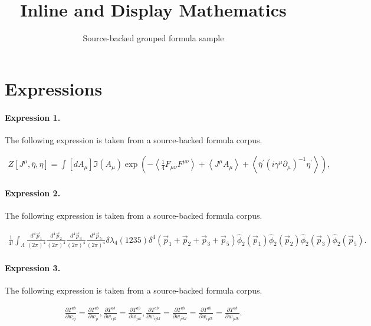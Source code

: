 \documentclass[11pt]{article}
\title{Inline and Display Mathematics}
\author{Source-backed grouped formula sample}
\date{}
\begin{document}
\maketitle
\section{Expressions}
\paragraph{Expression 1.} The following expression is taken from a source-backed formula corpus.

\begin{align*}Z\left[ J^\mu ,\overline{\eta },\eta \right] =\int\left[ dA_\mu \right] \Im \left( A_\mu \right) \exp \left( -\left\langle\frac 14F_{\mu \nu }F^{\mu \nu }\right\rangle +\left\langle J^\mu A_\mu\right\rangle +\left\langle \overline{\eta }^{\prime }\left( i\gamma ^\mu\partial _\mu \right) ^{-1}\eta ^{\prime }\right\rangle \right) ,\end{align*}

\paragraph{Expression 2.} The following expression is taken from a source-backed formula corpus.

\begin{align*}\frac{1}{4!}\int_{{\Lambda}} \frac{d^4\vec{p}_1}{(2{\pi})^4}\frac{d^4\vec{p}_2}{(2{\pi})^4} \frac{d^4\vec{p}_3}{(2{\pi})^4}\frac{d^4\vec{p}_5}{(2{\pi})^4} {\delta}{\lambda}_4(1235){\delta}^4(\vec{p}_1 + \vec{p}_2+\vec{p}_3+\vec{p}_5) \hat{\phi}_2(\vec{p}_1) \hat{\phi}_2(\vec{p}_2) \hat{\phi}_2(\vec{p}_3) \hat{\phi}_2(\vec{p}_5).\end{align*}

\paragraph{Expression 3.} The following expression is taken from a source-backed formula corpus.

\begin{align*}\frac{\partial T^{ab}}{\partial w_{ij}}=\frac{\partial T^{ab}}{\partial w_{ji}},\frac{\partial T^{ab}}{\partial w_{ijk}}=\frac{\partial T^{ab}}{\partial w_{jik}},\frac{\partial T^{ab}}{\partial w_{ijkl}}=\frac{\partial T^{ab}}{\partial w_{jikl}}=\frac{\partial T^{ab}}{\partial w_{ijlk}}=\frac{\partial T^{ab}}{\partial w_{jilk}}.\end{align*}
\end{document}
